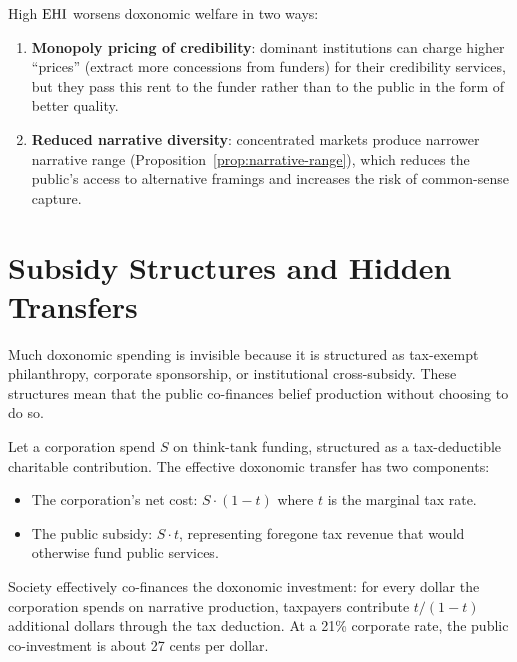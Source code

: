 \begin{proposition}
\label{prop:concentration-welfare}
High $\mathrm{EHI}$ worsens doxonomic welfare in two ways:
\begin{enumerate}[nosep]
  \item \textbf{Monopoly pricing of credibility}: dominant institutions can charge higher ``prices'' (extract more concessions from funders) for their credibility services, but they pass this rent to the funder rather than to the public in the form of better quality.
  \item \textbf{Reduced narrative diversity}: concentrated markets produce narrower narrative range (Proposition~\ref{prop:narrative-range}), which reduces the public's access to alternative framings and increases the risk of common-sense capture.
\end{enumerate}
\end{proposition}


\section{Subsidy Structures and Hidden Transfers}
\label{sec:ch10-subsidies}

Much doxonomic spending is invisible because it is structured as tax-exempt philanthropy, corporate sponsorship, or institutional cross-subsidy.
These structures mean that the public co-finances belief production without choosing to do so.

\begin{model}
\label{mod:hidden-transfer}
Let a corporation spend $S$ on think-tank funding, structured as a tax-deductible charitable contribution.
The effective doxonomic transfer has two components:
\begin{itemize}[nosep]
  \item The corporation's net cost: $S \cdot (1-t)$ where $t$ is the marginal tax rate.
  \item The public subsidy: $S \cdot t$, representing foregone tax revenue that would otherwise fund public services.
\end{itemize}
Society effectively co-finances the doxonomic investment: for every dollar the corporation spends on narrative production, taxpayers contribute $t/(1-t)$ additional dollars through the tax deduction.
At a 21\% corporate rate, the public co-investment is about 27 cents per dollar.
\end{model}


